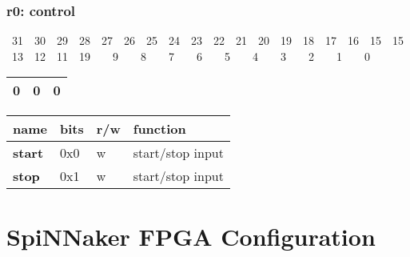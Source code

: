 \documentclass[11pt,a4paper,twoside]{article}
\begin{document}
\subsubsection*{\textbf{r0: control}}

{\footnotesize
~31~~30~~29~~28~~27~~26~~25~~24~~23~~22~~21~~20~~19~~18~~17~~16~~15~~15~~13~~12~~11~~19~~~~9~~~~8~~~~7~~~~6~~~~5~~~~4~~~~3~~~~2~~~~1~~~~0
}

\noindent
\begin{tabularx}{\linewidth}{| p{} | p{} | p{} |}
	\hline
	0             & 0            & 0  \\%
	\hline
\end{tabularx}


	\begin{center}
		\renewcommand{\arraystretch}{1.2}
		\begin{tabularx}{\textwidth}{| p{\ncw} p{\ocw} p{\rcw} X |}
			\hline
			\textbf{name}    & \textbf{bits} & \textbf{r/w} & \textbf{function} \\%
			\hline
			\hline
			\textbf{start}   & 0x0           & w            & start/stop input  \\%
			\textbf{stop}    & 0x1           & w            & start/stop input  \\%
			\hline
		\end{tabularx}
	\end{center}


\section{SpiNNaker FPGA Configuration}
\end{document}
